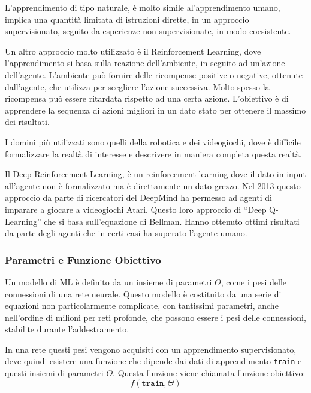 \documentclass{article}
\numberwithin{equation}{subsection}
\begin{document}
L'apprendimento di tipo naturale, è molto simile al'apprendimento umano, implica una quantità limitata 
di istruzioni dirette, in un approccio supervisionato, seguito da esperienze non supervisionate, 
in modo coesistente. 

Un altro approccio molto utilizzato è il Reinforcement Learning, dove l'apprendimento si 
basa sulla reazione dell'ambiente, in seguito ad un'azione dell'agente. L'ambiente può 
fornire delle ricompense positive o negative, ottenute dall'agente, che utilizza per 
scegliere l'azione successiva. Molto spesso la ricompensa può essere ritardata rispetto ad una 
certa azione. 
L'obiettivo è di apprendere la sequenza di azioni migliori in un dato stato per ottenere il 
massimo dei risultati. 

I domini più utilizzati sono quelli della robotica e dei videogiochi, dove è difficile formalizzare 
la realtà di interesse e descrivere in maniera completa questa realtà. 

Il Deep Reinforcement Learning, è un reinforcement learning dove il dato in input all'agente 
non è formalizzato ma è direttamente un dato grezzo. Nel 2013 questo approccio da parte di ricercatori 
del DeepMind ha permesso ad agenti di imparare a giocare a videogiochi Atari. Questo loro 
approccio di ``Deep Q-Learning'' che si basa sull'equazione di Bellman. Hanno ottenuto ottimi risultati da parte degli agenti che in certi casi ha superato l'agente umano.  

\subsubsection{Parametri e Funzione Obiettivo}

Un modello di ML è definito da un insieme di parametri $\Theta$, come i pesi delle connessioni 
di una rete neurale. 
Questo modello è costituito da una serie di equazioni non particolarmente complicate, con 
tantissimi parametri, anche nell'ordine di milioni per reti profonde, che possono essere i pesi delle connessioni, stabilite durante l'addestramento. 

In una rete questi pesi vengono acquisiti con un apprendimento supervisionato, deve quindi 
esistere una funzione che dipende dai dati di apprendimento \verb|train| e questi insiemi di parametri $\Theta$. 
Questa funzione viene chiamata funzione obiettivo:
\begin{equation}
    f(\texttt{train}, \Theta)
\end{equation}
\end{document}
